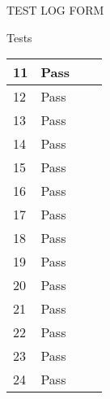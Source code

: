 \documentclass{article}
\begin{document}
\begin{section}{TEST LOG FORM}
\begin{subsection}{Tests}
\begin{tabularx}{\linewidth}{| p{1.5cm} | p{2cm} | p{9cm} | X |}
11
&
Pass
&

&

\\
\hline

12
&
Pass
&

&

\\
\hline

13
&
Pass 
&

&

\\
\hline

14
&
Pass
&

&

\\
\hline

15
&
Pass
&

&

\\
\hline

16
&
Pass
&

&

\\
\hline

17
&
Pass
&

&

\\
\hline

18
&
Pass
&

&

\\
\hline

19
&
Pass
&

&

\\
\hline

20
&
Pass
&

&

\\
\hline

21
&
Pass
&

&

\\
\hline

22
&
Pass
&

&

\\
\hline

23
&
Pass
&

&

\\
\hline

24
&
Pass
&

&

\\
\hline


\end{tabularx}
\end{subsection}
\end{section}
\end{document}
